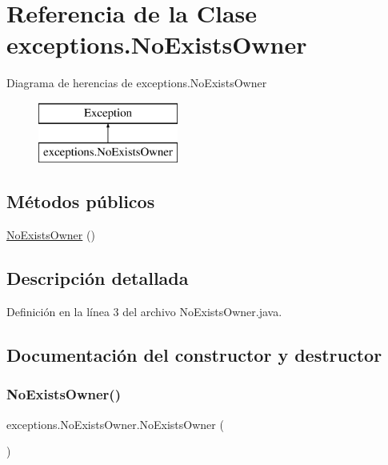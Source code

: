 \hypertarget{classexceptions_1_1_no_exists_owner}{}\section{Referencia de la Clase exceptions.\+No\+Exists\+Owner}
\label{classexceptions_1_1_no_exists_owner}
Diagrama de herencias de exceptions.\+No\+Exists\+Owner\begin{figure}[H]
\begin{center}
\leavevmode
\includegraphics[height=2.000000cm]{classexceptions_1_1_no_exists_owner}
\end{center}
\end{figure}
\subsection*{Métodos públicos}
\begin{DoxyCompactItemize}
\item 
\mbox{\hyperlink{classexceptions_1_1_no_exists_owner_a6deb4cd11cd63e554ad6c3bd290567c5}{No\+Exists\+Owner}} ()
\end{DoxyCompactItemize}


\subsection{Descripción detallada}


Definición en la línea 3 del archivo No\+Exists\+Owner.\+java.



\subsection{Documentación del constructor y destructor}
\mbox{\label{classexceptions_1_1_no_exists_owner_a6deb4cd11cd63e554ad6c3bd290567c5}} 
\subsubsection{\texorpdfstring{NoExistsOwner()}{NoExistsOwner()}}
{\footnotesize\ttfamily exceptions.\+No\+Exists\+Owner.\+No\+Exists\+Owner (\begin{DoxyParamCaption}{ }\end{DoxyParamCaption})}




